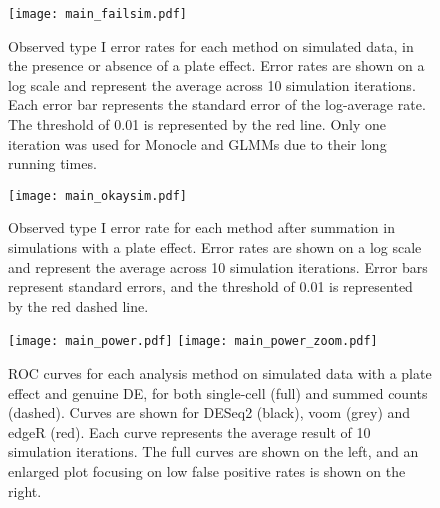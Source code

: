 \documentclass[oupdraft]{bio}
\begin{document}



\begin{figure}[!p]
\begin{center}
\texttt{[image: main\_failsim.pdf]}
\end{center}
\caption{
    Observed type I error rates for each method on simulated data, in the presence or absence of a plate effect.
    Error rates are shown on a log scale and represent the average across 10 simulation iterations.
    Each error bar represents the standard error of the log-average rate.
    The threshold of 0.01 is represented by the red line.
    Only one iteration was used for Monocle and GLMMs due to their long running times.
}
\label{fig:platefail}
\end{figure}

\begin{figure}[!p]
\begin{center}
\texttt{[image: main\_okaysim.pdf]}
\end{center}
\caption{
    Observed type I error rate for each method after summation in simulations with  a plate effect.
    Error rates are shown on a log scale and represent the average across 10 simulation iterations.
    Error bars represent standard errors, and the threshold of 0.01 is represented by the red dashed line.
}
\label{fig:platesum}
\end{figure}

\begin{figure}[!p]
\begin{center}
\texttt{[image: main\_power.pdf]}
\texttt{[image: main\_power\_zoom.pdf]}
\end{center}
\caption{
    ROC curves for each analysis method on simulated data with a plate effect and genuine DE, for both single-cell (full) and summed counts (dashed).
    Curves are shown for DESeq2 (black), voom (grey) and  edgeR (red).
    Each curve represents the average result of 10 simulation iterations.
    The full curves are shown on the left, and an enlarged plot focusing on low false positive rates is shown on the right.
}
\label{fig:roc}
\end{figure}
\end{document}
